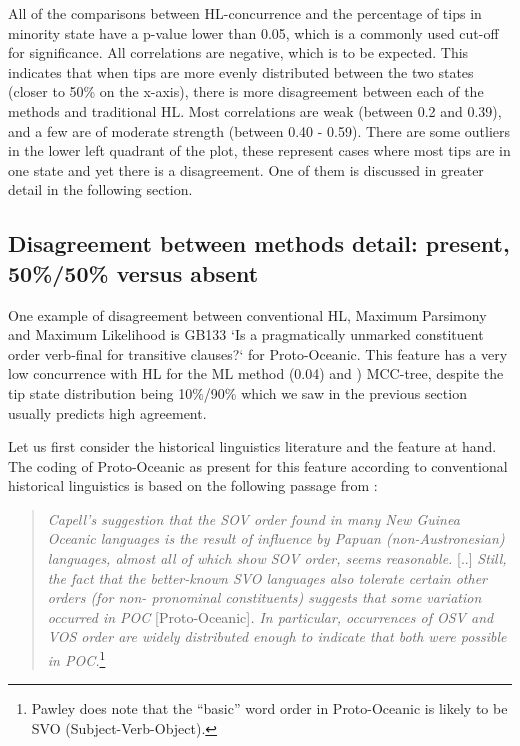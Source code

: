 \documentclass[12pt,letterpaper]{article}
\begin{document}
All of the comparisons between HL-concurrence and the percentage of tips in minority state have a p-value lower than 0.05, which is a commonly used cut-off for significance. All correlations are negative, which is to be expected. This indicates that when tips are more evenly distributed between the two states (closer to 50\% on the x-axis), there is more disagreement between each of the methods and traditional HL. Most correlations are weak (between 0.2 and 0.39), and a few are of moderate strength (between 0.40 - 0.59). There are some outliers in the lower left quadrant of the plot, these represent cases where most tips are in one state and yet there is a disagreement. One of them is discussed in greater detail in the following section.

\FloatBarrier

\subsection{Disagreement between methods detail: present, 50\%/50\% versus absent}
\label{supp:GB133_detail}
One example of disagreement between conventional HL, Maximum Parsimony and Maximum Likelihood is GB133 `Is a pragmatically unmarked constituent order verb-final for transitive clauses?` for Proto-Oceanic. This feature has a very low concurrence with HL for the ML method (0.04) and \citep{grayetal_2009}) MCC-tree, despite the tip state distribution being 10\%/90\% which we saw in the previous section usually predicts high agreement.

Let us first consider the historical linguistics literature and the feature at hand. The coding of Proto-Oceanic as present for this feature according to conventional historical linguistics is based on the following passage from \citet{pawley1973some}:

\begin{quotation}
\noindent\emph{
Capell's suggestion that the SOV order found in many New Guinea Oceanic languages is the result of influence by Papuan (non-Austronesian) languages, almost all of which show SOV order, seems reasonable. }[..]\emph{
Still, the fact that the better-known SVO languages also tolerate certain other orders (for non- pronominal constituents) suggests that some variation occurred in POC} [Proto-Oceanic]\emph{. In particular, occurrences of OSV and VOS order are widely distributed enough to indicate that both were possible in POC.}\footnote{Pawley does note that the ``basic'' word order in Proto-Oceanic is likely to be SVO (Subject-Verb-Object).}
\end{quotation} \begin{flushright}\citet[118]{pawley1973some}\end{flushright}
\end{document}
